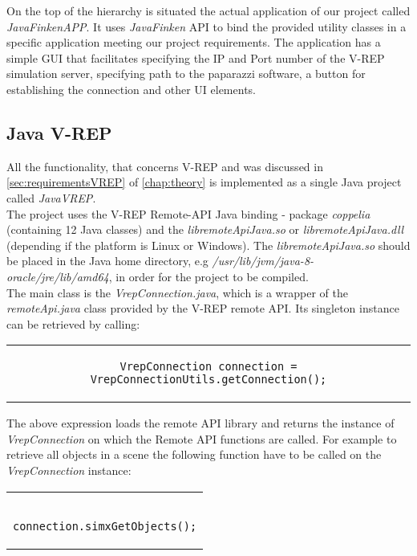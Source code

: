 On the top of the hierarchy is situated the actual application of our project called \textit{JavaFinkenAPP}. It uses \textit{JavaFinken} API to bind the provided utility classes in a specific application meeting our project requirements. The application has a simple \gls{GUI} that facilitates specifying the IP and Port number of the V-REP simulation server, specifying path to the paparazzi software, a button for establishing the connection and other UI elements.




\subsection{Java V-REP}
\label{sec:vrepImplementation}

All the functionality, that concerns V-REP and was discussed in \ref{sec:requirementsVREP} of \ref{chap:theory} is implemented as a single Java project called \textit{JavaVREP}.\\
 The project uses the V-REP Remote-API Java binding - package \textit{coppelia} (containing 12 Java classes) and the \textit{libremoteApiJava.so} or \textit{libremoteApiJava.dll} (depending if the platform is Linux or Windows). The \textit{libremoteApiJava.so} should be placed in the Java home directory, e.g \textit{/usr/lib/jvm/java-8-oracle/jre/lib/amd64}, in order for the project to be compiled.\\
The main class is the \textit{VrepConnection.java}, which is a wrapper of the \textit{remoteApi.java} class provided by the V-REP remote API. Its singleton instance can be retrieved by calling:

\begin{center}
\begin{tabular}{c}
\begin{lstlisting}[basicstyle=\small]
VrepConnection connection = VrepConnectionUtils.getConnection();
\end{lstlisting}
\end{tabular}
\end{center}

The above expression loads the remote API library and returns the instance of \textit{VrepConnection} on which the Remote API functions are called. For example to retrieve all objects in a scene the following function have to be called on the \textit{VrepConnection} instance:

\begin{center}
\begin{tabular}{c}
\begin{lstlisting}[basicstyle=\small]

connection.simxGetObjects();

\end{lstlisting}
\end{tabular}
\end{center}


